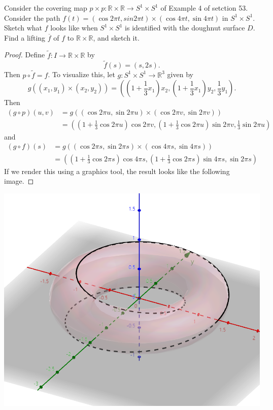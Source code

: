 \documentclass{article}
\begin{document}
\begin{multicols}{2}
\begin{exercise}
Consider the covering map $p\times p:\mathbb{R}\times \mathbb{R}\to S^1\times S^1$ of Example 4 of setction 53. Consider the path $f(t)=(\cos 2\pi t, sin 2\pi t)\times (\cos 4\pi t,\sin 4\pi t)$ in $S^1\times S^1$. Sketch what $f$ looks like when $S^1\times S^1$ is identified with the doughnut surface $D$. Find a lifting $\overline{f}$ of $f$ to $\mathbb{R}\times \mathbb{R}$, and sketch it.
\end{exercise}
\begin{proof}
Define $\tilde{f}:I\to \mathbb{R}\times \mathbb{R}$ by
$$\tilde{f}(s) = (s,2s).$$
Then $p\circ \tilde{f}=f$. To visualize this, let $g:S^1\times S^1\to \mathbb{R}^3$ given by 
$$g((x_1,y_1)\times (x_2,y_2))=((1+\frac{1}{3}x_1)x_2, (1+\frac{1}{3}x_1)y_2, \frac{1}{3}y_1).$$
Then 
\begin{align*}
    (g\circ p)(u,v) &= g((\cos 2\pi u,\sin 2\pi u)\times (\cos 2\pi v,\sin 2\pi v))\\
        &= ((1+\frac{1}{3}\cos 2\pi u)\cos 2\pi v, (1+\frac{1}{3}\cos 2\pi u)\sin 2\pi v, \frac{1}{3}\sin 2\pi u)
\end{align*}
and
\begin{align}
    (g\circ f)(s) &= g((\cos 2\pi s,\sin 2\pi s)\times (\cos 4\pi s,\sin 4\pi s)) \\
        &= ((1+\frac{1}{3}\cos 2\pi s)\cos 4\pi s, (1+\frac{1}{3}\cos 2\pi s)\sin 4\pi s, \sin 2\pi s)
\end{align}
If we render this using a graphics tool, the result looks like the following image.
\end{proof}
\includegraphics[width=0.9\linewidth]{torus.png}


\end{multicols}
\end{document}
